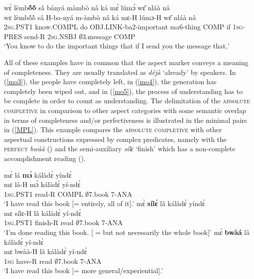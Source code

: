 \begin{exe} 
\ex\label{mo6}
  \glll wɛ̀ lèmb{\bfseries ṍõ̀} sâ bányá màmbò nâ ká mɛ́ lúmɔ́ wɛ̂ nláà nâ \\
       wɛ lèmbṍõ̀ sâ H-ba-nyá m-àmbò nâ ká mɛ-H lúmɔ-H wɛ̂ nláà nâ \\
        2\textsc{sg}.PST1 know.COMPL  do OBJ.LINK-ba2-important ma6-thing COMP if 1\textsc{sg}-PRES send-R 2\textsc{sg}.NSBJ $\emptyset$3.message COMP \\
    \trans `You know to do the important things that if I send you the message that,'
\end{exe}

All of these examples have in common that the aspect marker conveys a meaning of completeness. They are usually translated as {\itshape déjà} `already' by speakers.  In (\ref{mo3}), the people have completely left, in (\ref{mo4}), the generation has completely been wiped out, and in (\ref{mo5}), the process of understanding has to be complete in order to count as understanding. The delimitation of the \textsc{absolute completive} in comparison to other aspect categories with some semantic overlap in terms of completeness and/or perfectiveness is illustrated in the minimal pairs in (\ref{MPL}). This example compares the \textsc{absolute completive} with other aspectual constructions expressed by complex predicates, namely with the \textsc{perfect} {\itshape bwàà} () and the semi-auxiliary {\itshape sílɛ} `finish' which has a non-complete accomplishment reading ().

\begin{exe} 
\ex\label{MPL}
\begin{xlist}
\ex\label{MPL1}
  \glll     mɛ̀ lá {\bfseries mɔ̀} kálàdɛ̀ yíndɛ̀ \\
          mɛ lâ-H mɔ̀ kálàdɛ̀ yí-ndɛ̀\\
           1\textsc{sg}.PST1 read-R COMPL $\emptyset$7.book 7-ANA  \\
    \trans `I have read this book [= entirely, all of it].'
\ex\label{MPL2}
  \glll     mɛ̀ {\bfseries sílɛ́} lâ kálàdɛ̀ yíndɛ̀ \\
          mɛ sílɛ-H lâ kálàdɛ̀ yí-ndɛ̀ \\
           1\textsc{sg}.PST1 finish-R read $\emptyset$7.book 7-ANA  \\
    \trans `I'm done reading this book. [ = but not necessarily the whole book]'
\ex\label{MPL3}
  \glll     mɛ̀ {\bfseries bwàá} lâ kálàdɛ̀ yí-ndɛ̀ \\
            mɛ bwàà-H lâ kálàdɛ̀ yí-ndɛ̀\\
          1\textsc{sg} have-R read $\emptyset$7.book 7-ANA  \\
    \trans `I have read this book [= more general/experiential].'
\end{xlist}
\end{exe}

